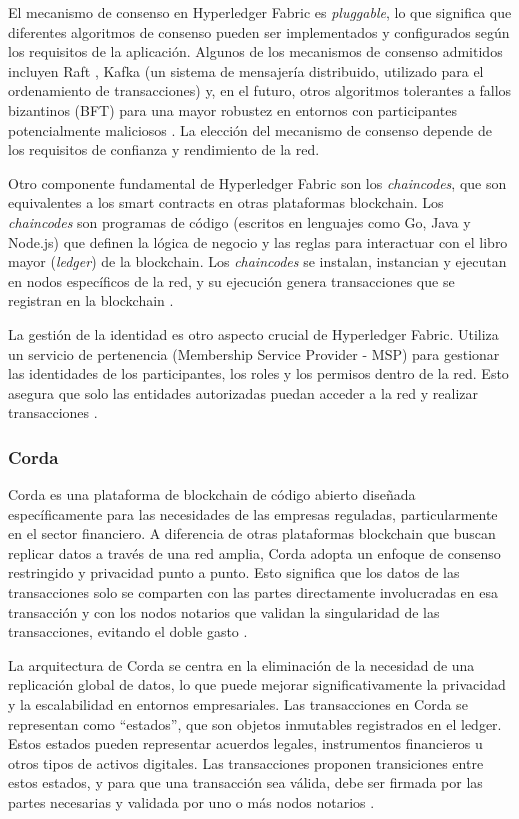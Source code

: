 El mecanismo de consenso en Hyperledger Fabric es \textit{pluggable}, lo que significa que diferentes algoritmos de consenso pueden ser implementados y configurados según los requisitos de la aplicación. Algunos de los mecanismos de consenso admitidos incluyen Raft , Kafka (un sistema de mensajería distribuido, utilizado para el ordenamiento de transacciones) y, en el futuro, otros algoritmos tolerantes a fallos bizantinos (BFT) para una mayor robustez en entornos con participantes potencialmente maliciosos \cite{Cachin2011}. La elección del mecanismo de consenso depende de los requisitos de confianza y rendimiento de la red.

Otro componente fundamental de Hyperledger Fabric son los \textit{chaincodes}, que son equivalentes a los smart contracts en otras plataformas blockchain. Los \textit{chaincodes} son programas de código (escritos en lenguajes como Go, Java y Node.js) que definen la lógica de negocio y las reglas para interactuar con el libro mayor (\textit{ledger}) de la blockchain. Los \textit{chaincodes} se instalan, instancian y ejecutan en nodos específicos de la red, y su ejecución genera transacciones que se registran en la blockchain \cite{HyperledgerFabricDocs}.

La gestión de la identidad es otro aspecto crucial de Hyperledger Fabric. Utiliza un servicio de pertenencia (Membership Service Provider - MSP) para gestionar las identidades de los participantes, los roles y los permisos dentro de la red. Esto asegura que solo las entidades autorizadas puedan acceder a la red y realizar transacciones \cite{HyperledgerFabricMSP}.

\subsubsection{Corda}
Corda es una plataforma de blockchain de código abierto diseñada específicamente para las necesidades de las empresas reguladas, particularmente en el sector financiero. A diferencia de otras plataformas blockchain que buscan replicar datos a través de una red amplia, Corda adopta un enfoque de consenso restringido y privacidad punto a punto. Esto significa que los datos de las transacciones solo se comparten con las partes directamente involucradas en esa transacción y con los nodos notarios que validan la singularidad de las transacciones, evitando el doble gasto \cite{R3Corda2021}.

La arquitectura de Corda se centra en la eliminación de la necesidad de una replicación global de datos, lo que puede mejorar significativamente la privacidad y la escalabilidad en entornos empresariales. Las transacciones en Corda se representan como “estados”, que son objetos inmutables registrados en el ledger. Estos estados pueden representar acuerdos legales, instrumentos financieros u otros tipos de activos digitales. Las transacciones proponen transiciones entre estos estados, y para que una transacción sea válida, debe ser firmada por las partes necesarias y validada por uno o más nodos notarios \cite{Hearn2016}.

